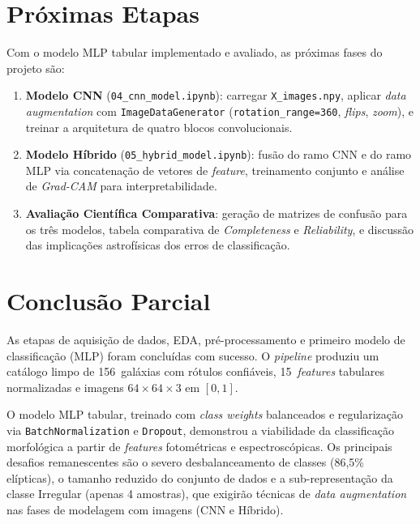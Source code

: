 \documentclass[12pt, a4paper]{article}
\begin{document}
\section{Próximas Etapas}

Com o modelo MLP tabular implementado e avaliado, as próximas fases do
projeto são:

\begin{enumerate}[leftmargin=2em]
  \item \textbf{Modelo CNN} (\texttt{04\_cnn\_model.ipynb}): carregar
        \texttt{X\_images.npy}, aplicar \textit{data augmentation} com
        \texttt{ImageDataGenerator} (\texttt{rotation\_range=360},
        \textit{flips}, \textit{zoom}), e treinar a arquitetura de quatro
        blocos convolucionais.

  \item \textbf{Modelo Híbrido} (\texttt{05\_hybrid\_model.ipynb}): fusão
        do ramo CNN e do ramo MLP via concatenação de vetores de
        \textit{feature}, treinamento conjunto e análise de
        \textit{Grad-CAM} para interpretabilidade.

  \item \textbf{Avaliação Científica Comparativa}: geração de matrizes de
        confusão para os três modelos, tabela comparativa de
        \textit{Completeness} e \textit{Reliability}, e discussão das
        implicações astrofísicas dos erros de classificação.
\end{enumerate}

\section{Conclusão Parcial}

As etapas de aquisição de dados, EDA, pré-processamento e primeiro modelo
de classificação (MLP) foram concluídas com sucesso. O \textit{pipeline}
produziu um catálogo limpo de 156~galáxias com rótulos confiáveis,
15~\textit{features} tabulares normalizadas e imagens
$64 \times 64 \times 3$ em $[0,1]$.

O modelo MLP tabular, treinado com \textit{class weights} balanceados
e regularização via \texttt{BatchNormalization} e \texttt{Dropout},
demonstrou a viabilidade da classificação morfológica a partir de
\textit{features} fotométricas e espectroscópicas. Os principais desafios
remanescentes são o severo desbalanceamento de classes (86,5\% elípticas),
o tamanho reduzido do conjunto de dados e a sub-representação da classe
Irregular (apenas 4 amostras), que exigirão técnicas de \textit{data
augmentation} nas fases de modelagem com imagens (CNN e Híbrido).
\end{document}
